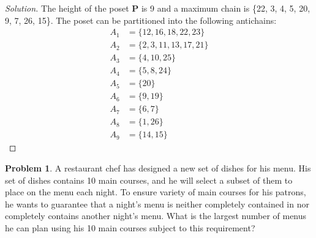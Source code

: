 \documentclass[12pt]{article}
\newcounter{chapternumber}
\theoremstyle{definition}
\newtheorem{problem-internal}{Problem}[chapternumber]
\newenvironment{problem}{
  \medskip
  \begin{problem-internal}
}{
\end{problem-internal}
}
\newenvironment{solution}{
  \begin{proof}[Solution]
    \vspace{-8px}
    \setlength{\parskip}{4px}
    \setlength{\parindent}{0px}
}{
\end{proof}
}
\begin{document}
  \begin{solution}
    The height of the poset \textbf{P} is 9 and a maximum chain is \{22, 3, 4, 5, 20, 9, 7, 26, 15\}. The poset can be partitioned into the following antichains:
    \begin{align*}
      A_{1} &= \{12, 16, 18, 22, 23\} \\
      A_{2} &= \{2, 3, 11, 13, 17, 21\} \\
      A_{3} &= \{4, 10, 25\} \\
      A_{4} &= \{5, 8, 24\} \\
      A_{5} &= \{20\} \\
      A_{6} &= \{9, 19\} \\
      A_{7} &= \{6, 7\} \\
      A_{8} &= \{1, 26\} \\
      A_{9} &= \{14, 15\}
    \end{align*}
  \end{solution}

  \setcounter{problem-internal}{10}
  \begin{problem}
    A restaurant chef has designed a new set of dishes for his menu. His set of dishes contains 10 main courses, and he will select a subset of them to place on the menu each night. To ensure variety of main courses for his patrons, he wants to guarantee that a night's menu is neither completely contained in nor completely contains another night's menu. What is the largest number of menus he can plan using his 10 main courses subject to this requirement?
  \end{problem}
\end{document}
